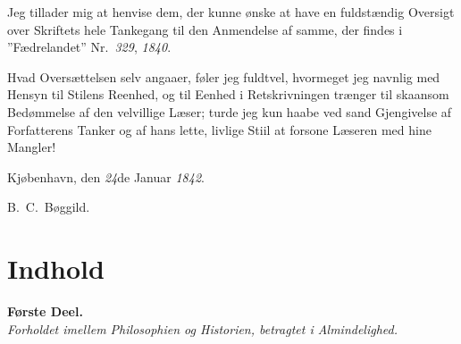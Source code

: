 \documentclass[12pt]{book}
\begin{document}
Jeg tillader mig at henvise dem, der kunne ønske at have en fuldstændig
Oversigt over Skriftets hele Tankegang til den Anmendelse af samme, der
findes i ”Fædrelandet” Nr.\ \textit{329}, \textit{1840}.

Hvad Oversættelsen selv angaaer, føler jeg fuldtvel, hvormeget jeg navnlig
med Hensyn til Stilens Reenhed, og til Eenhed i Retskrivningen trænger til
skaansom Bedømmelse af den velvillige Læser; turde jeg kun haabe ved sand
Gjengivelse af Forfatterens Tanker og af hans lette, livlige Stiil at forsone
Læseren med hine Mangler!

\bigskip
\begin{center}
Kjøbenhavn, den \textit{24}de Januar \textit{1842}.
\end{center}

\nopagebreak
\begin{flushright}
{\large B.\ C.\ Bøggild.}\hspace*{3em}
\end{flushright}

\chapter*{Indhold}
{}

\begingroup
\parindent=0pt
\parfillskip=0pt

\begin{center}
  {\large\bfseries Første Deel.}\\[0.5\baselineskip]
  \emph{Forholdet imellem Philosophien og Historien, betragtet i
  Almindelighed.}
\end{center}
\medskip
\end{document}
